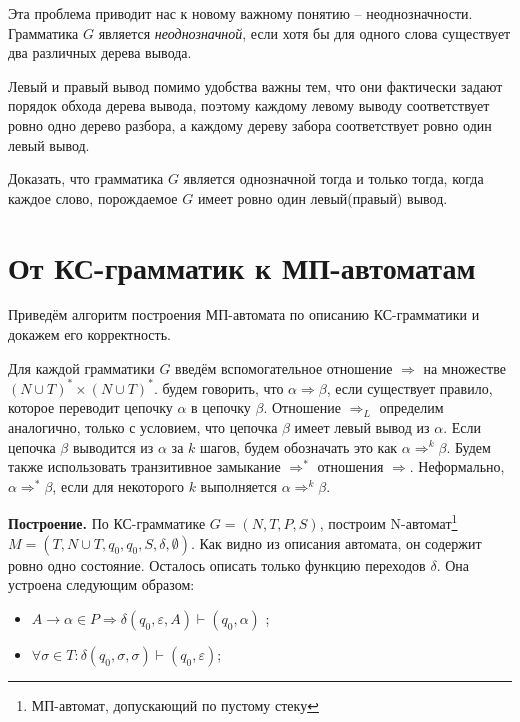 \documentclass[12pt]{article}
\theoremstyle{definiton}
\theoremstyle{definition}
\theoremstyle{definition}
\let\es\emptyset
\let\eps\varepsilon
\let\yield\Rightarrow
\newcounter{problem}
\newcounter{uproblem}
\newcounter{subproblem}
\def\upr{\medskip\noindent\stepcounter{uproblem}{\bf Упражнение \theuproblem .  }\setcounter{subproblem}{0} }
\begin{document}
Эта проблема приводит нас к новому важному понятию -- неоднозначности. Грамматика $G$ является \emph{неоднозначной}, если хотя бы для одного слова существует два различных дерева вывода.




Левый и правый вывод помимо удобства важны тем, что они фактически задают порядок обхода дерева вывода, поэтому каждому левому выводу соответствует ровно одно дерево разбора, а каждому дереву забора соответствует ровно один левый вывод.

\upr Доказать, что грамматика $G$ является однозначной тогда и только тогда, когда каждое слово, порождаемое $G$ имеет ровно один левый(правый) вывод.

\section{От КС-грамматик к МП-автоматам}

Приведём алгоритм построения МП-автомата по описанию КС-грамматики и докажем его корректность.

Для каждой грамматики $G$ введём вспомогательное отношение $\yield $ на множестве $(N\cup T)^*\times (N\cup T)^*$. будем говорить, что $\alpha \yield \beta$, если существует правило, которое переводит цепочку $\alpha$ в цепочку $\beta$. Отношение $\yield_L$ определим аналогично, только с условием, что цепочка $\beta$ имеет левый вывод из $\alpha$. Если цепочка $\beta$ выводится из $\alpha$ за $k$ шагов, будем обозначать это как $\alpha \yield^k \beta$. Будем также использовать транзитивное замыкание $\yield^*$ отношения $\yield$. Неформально, $\alpha \yield^* \beta$, если для некоторого $k$ выполняется $\alpha \yield^k \beta$.

\textbf{Построение.} По КС-грамматике $G = (N,T,P,S)$, построим N-автомат\footnote{МП-автомат, допускающий по пустому стеку} $M = (T, N\cup T, {q_0}, q_0, S, \delta, \es)$. Как видно из описания автомата, он содержит ровно одно состояние. Осталось описать только функцию переходов $ \delta$. Она устроена следующим образом:
\begin{itemize}
	\item $A \to \alpha \in P \Rightarrow \delta(q_0,\eps,A) \vdash (q_0,\alpha)$ ;
	\item $\forall \sigma \in T: \delta(q_0,\sigma,\sigma) \vdash (q_0,\eps) $;
\end{itemize}
\end{document}
